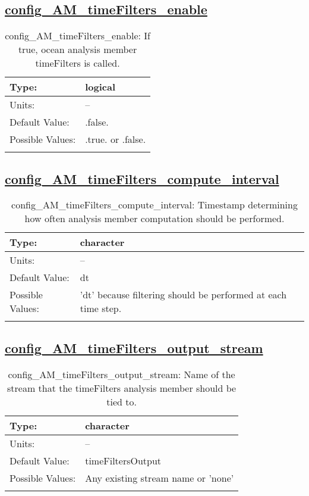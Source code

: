 \subsection[config\_AM\_timeFilters\_enable]{\hyperref[sec:nm_tab_AM_timeFilters]{config\_AM\_timeFilters\_enable}}
\label{subsec:nm_sec_config_AM_timeFilters_enable}
\begin{center}
\begin{longtable}{| p{2.0in} || p{4.0in} |}
    \hline
    Type: & logical \\
    \hline
    Units: & -- \\
    \hline
    Default Value: & .false. \\
    \hline
    Possible Values: & .true. or .false. \\
    \hline
    \caption{config\_AM\_timeFilters\_enable: If true, ocean analysis member timeFilters is called.}
\end{longtable}
\end{center}
\subsection[config\_AM\_timeFilters\_compute\_interval]{\hyperref[sec:nm_tab_AM_timeFilters]{config\_AM\_timeFilters\_compute\_interval}}
\label{subsec:nm_sec_config_AM_timeFilters_compute_interval}
\begin{center}
\begin{longtable}{| p{2.0in} || p{4.0in} |}
    \hline
    Type: & character \\
    \hline
    Units: & -- \\
    \hline
    Default Value: & dt \\
    \hline
    Possible Values: & 'dt' because filtering should be performed at each time step. \\
    \hline
    \caption{config\_AM\_timeFilters\_compute\_interval: Timestamp determining how often analysis member computation should be performed.}
\end{longtable}
\end{center}
\subsection[config\_AM\_timeFilters\_output\_stream]{\hyperref[sec:nm_tab_AM_timeFilters]{config\_AM\_timeFilters\_output\_stream}}
\label{subsec:nm_sec_config_AM_timeFilters_output_stream}
\begin{center}
\begin{longtable}{| p{2.0in} || p{4.0in} |}
    \hline
    Type: & character \\
    \hline
    Units: & -- \\
    \hline
    Default Value: & timeFiltersOutput \\
    \hline
    Possible Values: & Any existing stream name or 'none' \\
    \hline
    \caption{config\_AM\_timeFilters\_output\_stream: Name of the stream that the timeFilters analysis member should be tied to.}
\end{longtable}
\end{center}
